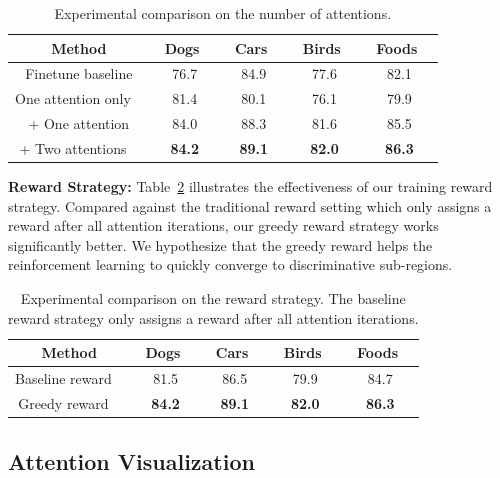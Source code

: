 \documentclass[10pt,twocolumn,letterpaper]{article}
\begin{document}

\begin{table}[t]
\centering
\begin{tabular}{c||c|c|c|c}
\hline
Method & \ Dogs \ & \ Cars \ & \ Birds \ & \ Foods \ \\\hline\hline
Finetune baseline & 76.7 & 84.9 & 77.6 & 82.1 \\
One attention only \ & 81.4 & 80.1 & 76.1 & 79.9 \\
+ One attention & 84.0 & 88.3 & 81.6 & 85.5 \\
+ Two attentions \ & \bf{84.2} & \bf{89.1} & \bf{82.0} & \bf{86.3} \\ \hline
\end{tabular}
\caption{Experimental comparison on the number of attentions.}
\label{tab:number_of_attention}
\end{table}

\textbf{Reward Strategy:}
Table~\ref{tab:reward_strategy} illustrates the effectiveness of our training reward strategy.
Compared against the traditional reward setting which only assigns a reward after all attention iterations, our greedy reward strategy works significantly better.
We hypothesize that the greedy reward helps the reinforcement learning to quickly converge to discriminative sub-regions.

\begin{table}[t]
\centering
\begin{tabular}{c||c|c|c|c}
\hline
Method & \ Dogs \ & \ Cars \ & \ Birds \  & \ Foods \ \\\hline\hline
Baseline reward \  & 81.5 &  86.5  &  79.9  &   84.7 \\
Greedy reward \ & \bf{84.2}  & \bf{89.1} & \bf{82.0} & \bf{86.3} \\  \hline
\end{tabular}
\caption{Experimental comparison on the reward strategy.
The baseline reward strategy only assigns a reward after all attention iterations.
}
\label{tab:reward_strategy}
\end{table}

\subsection{Attention Visualization}
\end{document}

